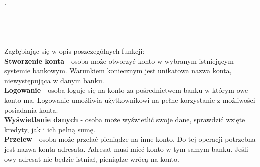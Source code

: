 \documentclass[8pt]{article}
\begin{document}
\begin{center}
\end{center}
.\\
\\
\\
\\
\\
Zagłębiając się w opis poszczególnych funkcji:\\
\textbf{Stworzenie konta} - osoba może otworzyć konto w wybranym istniejącym systemie bankowym. Warunkiem koniecznym jest unikatowa nazwa konta, niewystępująca w danym banku.\\

\textbf{Logowanie} - osoba loguje się na konto za pośrednictwem banku w którym owe konto ma. Logowanie umożliwia użytkownikowi na pełne korzystanie z możliwości posiadania konta.\\

\textbf{Wyświetlanie danych} - osoba może wyświetlić swoje dane, sprawdzić wzięte kredyty, jak i ich pełną sumę.\\

\textbf{Przelew} - osoba może przelać pieniądze na inne konto. Do tej operacji potrzebna jest nazwa konta adresata. Adresat musi mieć konto w tym samym banku. Jeśli owy adresat nie będzie istniał, pieniądze wrócą na konto.\\
\end{document}
